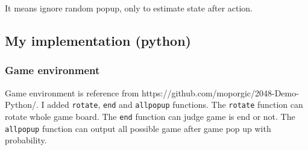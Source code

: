 \documentclass[12pt]{article}
\begin{document}
It means ignore random popup, only to estimate state after action.

\subsection{My implementation (python)}

\subsubsection{Game environment}

Game environment is reference from https://github.com/moporgic/2048-Demo-Python/. I added \verb|rotate|, \verb|end| and \verb|allpopup| functions. The \verb|rotate| function can rotate whole game board. The \verb|end| function can judge game is end or not. The \verb|allpopup| function can output all possible game after game pop up with probability.
\end{document}
